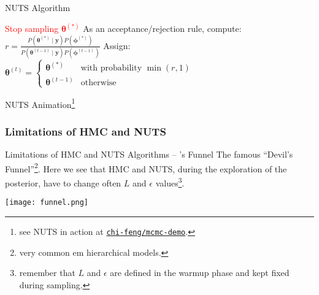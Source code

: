 \begin{frame}{NUTS Algorithm}
\begin{algorithm}[H]
{{{				}{
					\textcolor{red}{Stop sampling $\boldsymbol{\theta}^{(*)}$\;
					}
				}
			}
		}
		As an acceptance/rejection rule, compute:
		$r = \frac{P \left(\boldsymbol{\theta}^{(*)} \mid \mathbf{y} \right) P \left(\boldsymbol{\phi}^{(*)} \right)}{P \left(\boldsymbol{\theta}^{(t-1)} \mid \mathbf{y} \right) P \left(\boldsymbol{\phi}^{(t-1)} \right)}$\;
		Assign:
		$
			\boldsymbol{\theta}^{(t)} =
			\begin{cases}
				\boldsymbol{\theta}^{(*)}   & \text{with probability $\min(r,1)$} \\
				\boldsymbol{\theta}^{(t-1)} & \text{otherwise}
			\end{cases}
		$\;
		\caption{No-U-Turn-Sampler (NUTS)}
	\end{algorithm}
\end{frame}

\begin{frame}{NUTS Animation\footnote{see NUTS in action at \href{https://chi-feng.github.io/mcmc-demo/app.html?algorithm=EfficientNUTS&target=banana}{\texttt{chi-feng/mcmc-demo}}.}}
	\centering
\end{frame}

\subsubsection{Limitations of HMC and NUTS}
\begin{frame}{Limitations of HMC and NUTS Algorithms -- \textcite{nealSliceSampling2003}'s Funnel}
	The famous ``Devil's Funnel''\footnote{very common em hierarchical models.}.
	Here we see that HMC and NUTS, during the exploration of the posterior,
	have to change often $L$ and $\epsilon$ values\footnote{
		remember that $L$ and $\epsilon$ are defined in the warmup phase and kept fixed during sampling.}.




	\centering
	\texttt{[image: funnel.png]}
\end{frame}

